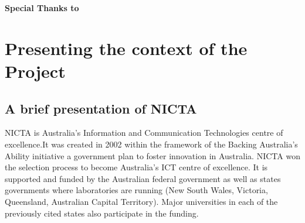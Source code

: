 \documentclass[10pt]{article}
\begin{document}
\newpage
{} %
\restoregeometry
\renewcommand{\thesection}{\Roman{section}} 

\renewcommand{\abstractname}{Executive Summary}
\begin{abstract}
\lipsum[1-2]
\end{abstract}


\newpage

\begin{center}
\begin{minipage}{.8\textwidth}
\textbf{\large Special Thanks to}\\
\end{minipage}
\end{center}

\newpage

\tableofcontents
\newpage
{}
\setcounter{page}{1}
\pagestyle{fancy}
\renewcommand{\sectionmark}[1]{\markright{\thesection.\ #1}}
\fancyhead{}
\fancyhead[R]{\slshape \rightmark}
\fancyfoot{}
\fancyfoot[C]{\thepage}
\renewcommand{\headrulewidth}{0.4pt}
\renewcommand{\footrulewidth}{0 pt}

\section{Presenting the context of the Project}
\subsection{A brief presentation of NICTA}
NICTA is Australia's Information and Communication Technologies centre of excellence.\footnotemark It was created in 2002 within the framework of the Backing Australia's Ability initiative a government plan to foster innovation in Australia. NICTA won the selection process to become Australia's ICT centre of excellence. It is supported and funded by the Australian federal government as well as states governments where laboratories are running (New South Wales, Victoria, Queensland, Australian Capital Territory). Major universities in each of the previously cited states also participate in the funding.\\

\end{document}
